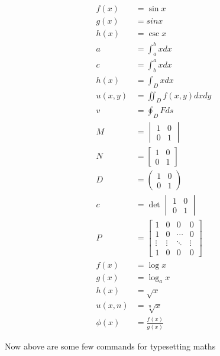 \documentclass{article}
\begin{document}
  \begin{align*}
    f(x)&=\sin{x}\\
    g(x)&=sinx\\  
    h(x)&=\csc{x}\\
    a &= \int_a^bxdx\\ %
    c &= \int^a_bxdx\\ %
    h(x) &= \int_Dxdx\\
    u(x,y) &= \iint_D f(x,y)dxdy\\
    v &= \oint_DFds\\
    M &= \begin{vmatrix}
      1&0\\
      0&1
    \end{vmatrix}\\
    N&=\begin{bmatrix}
      1&0\\
      0&1
    \end{bmatrix}\\
    D&=\begin{pmatrix}
      1&0\\
      0&1
    \end{pmatrix}\\
    c&=\det{\begin{vmatrix}
      1&0\\
      0&1
    \end{vmatrix}}\\
    P&=\begin{bmatrix}
      1&0&0&0\\
      1 & 0 & \cdots & 0\\
      \vdots&\vdots&\ddots&\vdots\\
      1&0&0&0
    \end{bmatrix}\\
    f(x)&=\log{x}\\
    g(x)&=\log_a{x}\\
    h(x)&=\sqrt{x}\\
    u(x,n)&=\sqrt[n]{x}\\
    \phi(x)&=\frac{f(x)}{g(x)}
  \end{align*}
  
  Now above are some few commands for typesetting maths  
\end{document}
